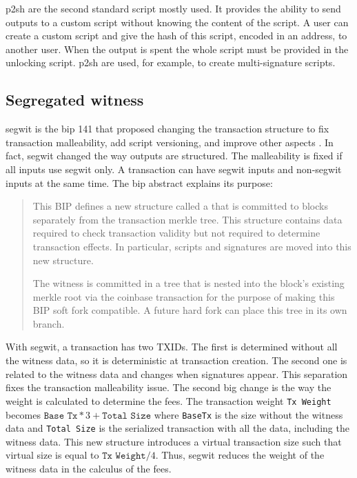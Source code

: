 \gls{p2sh} are the second standard script mostly used. It provides the ability
to send outputs to a custom script without knowing the content of the script.
A user can create a custom script and give the hash of this script, encoded in an address,
to another user. When the output is spent the whole script must be provided in
the unlocking script. \gls{p2sh} are used, for example, to create multi-signature scripts.

\subsection{Segregated witness}

\gls{segwit} is the \gls{bip} 141 that proposed changing the transaction
structure to fix transaction malleability, add script versioning, and improve
other aspects \cite{SegWit, SegWitBIP}. In fact, \gls{segwit} changed the way
outputs are structured. The malleability is fixed if all inputs use \gls{segwit}
only. A transaction can have \gls{segwit} inputs and non-\gls{segwit} inputs at
the same time. The \gls{bip} abstract explains its purpose:

\begin{quote}
  This BIP defines a new structure called a  that is committed to
  blocks separately from the transaction merkle tree. This structure contains
  data required to check transaction validity but not required to determine
  transaction effects. In particular, scripts and signatures are moved into this
  new structure.

  The witness is committed in a tree that is nested into the block's existing
  merkle root via the coinbase transaction for the purpose of making this BIP
  soft fork compatible. A future hard fork can place this tree in its own branch.
\end{quote}

With \gls{segwit}, a transaction has two TXIDs. The first is determined without
all the witness data, so it is deterministic at transaction creation. The
second one is related to the witness data and changes when signatures appear.
This separation fixes the transaction malleability issue. The second big change is the
way the weight is calculated to determine the fees. The transaction weight
\texttt{Tx Weight} becomes $\texttt{Base Tx} * 3 + \texttt{Total Size}$ where
\texttt{BaseTx} is the size without the witness data and \texttt{Total Size} is
the serialized transaction with all the data, including the witness data. This new structure introduces a
virtual transaction size such that virtual size is equal to $\texttt{Tx Weight} /
4$. Thus, \gls{segwit} reduces the weight of the witness data in the calculus of
the fees.

